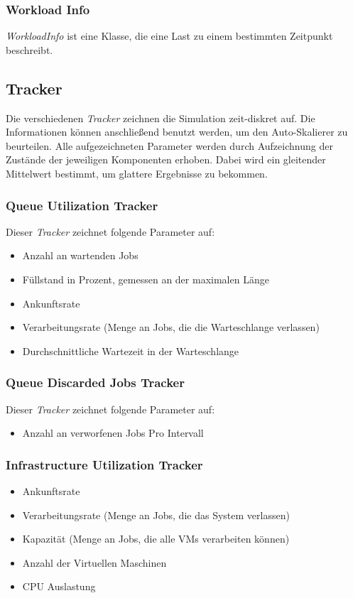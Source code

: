 \subsubsection{Workload Info}
\textit{WorkloadInfo} ist eine Klasse, die eine Last zu einem bestimmten Zeitpunkt beschreibt.

\subsection{Tracker}
Die verschiedenen \textit{Tracker} zeichnen die Simulation zeit-diskret auf. Die Informationen können anschließend benutzt werden, um den Auto-Skalierer zu beurteilen. Alle aufgezeichneten Parameter werden durch Aufzeichnung der Zustände der jeweiligen Komponenten erhoben. Dabei wird ein gleitender Mittelwert bestimmt, um glattere Ergebnisse zu bekommen.

\subsubsection{Queue Utilization Tracker}
Dieser \textit{Tracker} zeichnet folgende Parameter auf:
\begin{itemize}
	\item Anzahl an wartenden Jobs 
	\item Füllstand in Prozent, gemessen an der maximalen Länge
	\item Ankunftsrate
	\item Verarbeitungsrate (Menge an Jobs, die die  Warteschlange verlassen)
	\item Durchschnittliche Wartezeit in der Warteschlange
\end{itemize}

\subsubsection{Queue Discarded Jobs Tracker}
Dieser \textit{Tracker} zeichnet folgende Parameter auf:
\begin{itemize}
	\item Anzahl an verworfenen Jobs Pro Intervall
\end{itemize}

\subsubsection{Infrastructure Utilization Tracker}
\begin{itemize}
	\item Ankunftsrate
	\item Verarbeitungsrate (Menge an Jobs, die das System verlassen)
	\item Kapazität (Menge an Jobs, die alle VMs verarbeiten können)
	\item Anzahl der Virtuellen Maschinen
	\item CPU Auslastung
\end{itemize}

